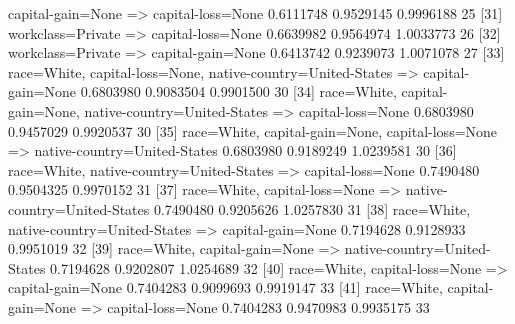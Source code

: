 \documentclass [a4paper] {article}
\begin{document}
{\begin{Schunk}
\begin{Soutput}
{      capital-gain=None}            => {capital-loss=None}            0.6111748  0.9529145 0.9996188      25
[31] {workclass=Private}            => {capital-loss=None}            0.6639982  0.9564974 1.0033773      26
[32] {workclass=Private}            => {capital-gain=None}            0.6413742  0.9239073 1.0071078      27
[33] {race=White,                                                                                           
      capital-loss=None,                                                                                    
      native-country=United-States} => {capital-gain=None}            0.6803980  0.9083504 0.9901500      30
[34] {race=White,                                                                                           
      capital-gain=None,                                                                                    
      native-country=United-States} => {capital-loss=None}            0.6803980  0.9457029 0.9920537      30
[35] {race=White,                                                                                           
      capital-gain=None,                                                                                    
      capital-loss=None}            => {native-country=United-States} 0.6803980  0.9189249 1.0239581      30
[36] {race=White,                                                                                           
      native-country=United-States} => {capital-loss=None}            0.7490480  0.9504325 0.9970152      31
[37] {race=White,                                                                                           
      capital-loss=None}            => {native-country=United-States} 0.7490480  0.9205626 1.0257830      31
[38] {race=White,                                                                                           
      native-country=United-States} => {capital-gain=None}            0.7194628  0.9128933 0.9951019      32
[39] {race=White,                                                                                           
      capital-gain=None}            => {native-country=United-States} 0.7194628  0.9202807 1.0254689      32
[40] {race=White,                                                                                           
      capital-loss=None}            => {capital-gain=None}            0.7404283  0.9099693 0.9919147      33
[41] {race=White,                                                                                           
      capital-gain=None}            => {capital-loss=None}            0.7404283  0.9470983 0.9935175      33

\end{Soutput}
\end{Schunk}}
\end{document}
